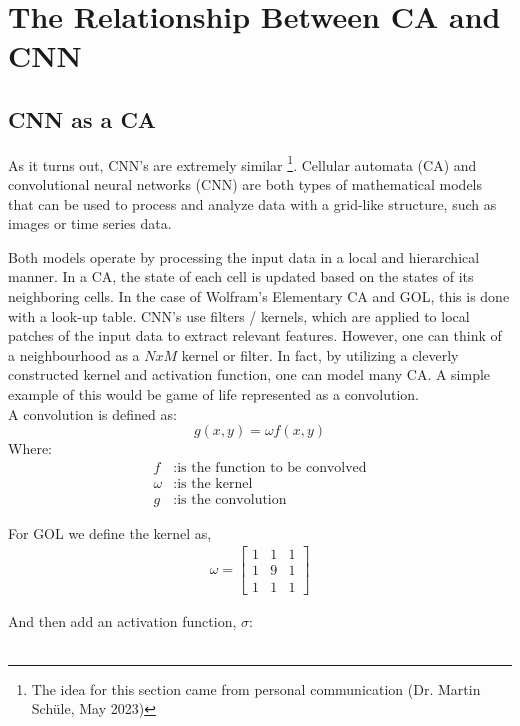 \section{The Relationship Between CA and CNN}
\label{ca-cnn}
\subsection{CNN as a CA}
As it turns out, CNN's are extremely similar \footnote{The idea for this section came from personal communication (Dr. Martin Schüle, May 2023)}. Cellular automata (CA) and convolutional neural networks (CNN) are both types of mathematical models that can be used to process and analyze data with a grid-like structure, such as images or time series data. \cite{PhysRevE.100.032402}

Both models operate by processing the input data in a local and hierarchical manner. In a CA, the state of each cell is updated based on the states of its neighboring cells. In the case of Wolfram's Elementary CA and GOL, this is done with a look-up table. CNN's use filters / kernels, which are applied to local patches of the input data to extract relevant features. However, one can think of a neighbourhood as a $NxM$ kernel or filter. In fact, by utilizing a cleverly constructed kernel and activation function, one can model many CA. A simple example of this would be game of life represented as a convolution. \\

A convolution is defined as: \\

\begin{equation*}
	g(x,y) = \omega f(x, y)
\end{equation*}
Where:
\begin{align*}
	f &: \text{is the function to be convolved} \\
	\omega &: \text{is the kernel}  \\
	g &: \text{is the convolution} 
\end{align*} 

For GOL we define the kernel as,
\begin{gather*}
	\omega = 
	\begin{bmatrix}
		1 & 1 & 1 \\
		1 & 9 & 1 \\
		1 & 1 & 1
	\end{bmatrix}
\end{gather*}


And then add an activation function, $\sigma$: \\ \\

